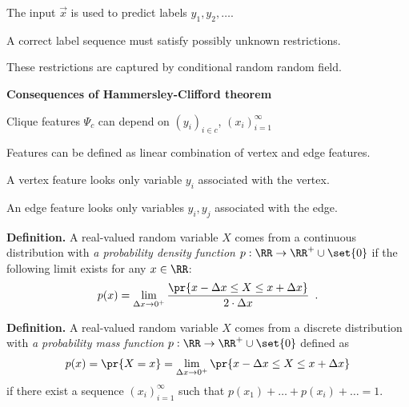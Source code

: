 \documentclass[landscape,footrule]{foils}
\begin{document}
\enlargethispage{1cm}


\begin{triangles}
\item The input $\vec{x}$ is used to predict labels $y_1,y_2,\ldots$.
\item A correct label sequence must satisfy possibly unknown restrictions.
\item These restrictions are captured by conditional random random field.
\end{triangles}\vspace*{0.5cm}


\textbf{Consequences of Hammersley-Clifford theorem}
\begin{triangles}
\item Clique features $\Psi_c$ can depend on $(y_i)_{i\in c}$, $(x_i)_{i=1}^\infty$ 
\item Features can be defined as linear combination of vertex and edge features.
\item A vertex feature looks only variable $y_i$ associated with the vertex.
\item An edge feature looks only variables $y_i, y_j$ associated with the edge.
\end{triangles}











\textbf{Definition.}
A real-valued random variable $X$ comes from a continuous distribution with \emph{a probability density function} $p:\RR\to\RR^+\cup\set{0}$ if the following limit exists for any $x\in\RR$:
\begin{align*}
p(x)=\lim_{\Delta x \to 0^+} \frac{\pr{x -\Delta x \leq X\leq x+\Delta x}}{2\cdot \Delta x}\enspace.
\end{align*} 




\textbf{Definition.}
A real-valued random variable $X$ comes from a discrete distribution with \emph{a probability mass function} $p:\RR\to\RR^+\cup\set{0}$ defined as 
\begin{align*}
p(x)=\pr{X=x}=\lim_{\Delta x \to 0^+} \pr{x-\Delta x \leq X\leq x+\Delta x}
\end{align*}  
if there exist a sequence $(x_i)_{i=1}^\infty$ such that $p(x_1)+\ldots+p(x_i)+\ldots =1$.
\end{document}
